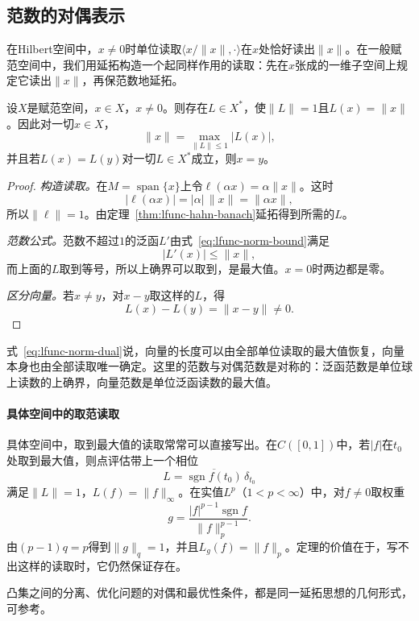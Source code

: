 \subsection{范数的对偶表示}
\label{sec:lfunc-norm-dual}

在Hilbert空间中，$x\neq0$时单位读取$\langle x/\lVert x\rVert,\cdot\rangle$在$x$处恰好读出$\lVert x\rVert$。在一般赋范空间中，我们用延拓构造一个起同样作用的读取：先在$x$张成的一维子空间上规定它读出$\lVert x\rVert$，再保范数地延拓。

\begin{theorem}[范数的对偶表示]
\label{thm:lfunc-norming}
设$X$是赋范空间，$x\in X$，$x\neq0$。则存在$L\in X^*$，使$\lVert L\rVert=1$且$L(x)=\lVert x\rVert$。因此对一切$x\in X$，
\begin{equation}
\lVert x\rVert=\max_{\lVert L\rVert\leq1}\lvert L(x)\rvert ,
\label{eq:lfunc-norm-dual}
\end{equation}
并且若$L(x)=L(y)$对一切$L\in X^*$成立，则$x=y$。
\end{theorem}

\begin{proof}
\emph{构造读取。}在$M=\operatorname{span}\{x\}$上令$\ell(\alpha x)=\alpha\lVert x\rVert$。这时
\[
\lvert\ell(\alpha x)\rvert=\lvert\alpha\rvert\,\lVert x\rVert=\lVert\alpha x\rVert ,
\]
所以$\lVert\ell\rVert=1$。由定理~\ref{thm:lfunc-hahn-banach}延拓得到所需的$L$。

\emph{范数公式。}范数不超过$1$的泛函$L'$由式~\eqref{eq:lfunc-norm-bound}满足
\[
\lvert L'(x)\rvert\leq\lVert x\rVert ,
\]
而上面的$L$取到等号，所以上确界可以取到，是最大值。$x=0$时两边都是零。

\emph{区分向量。}若$x\neq y$，对$x-y$取这样的$L$，得
\[
L(x)-L(y)=\lVert x-y\rVert\neq0 .
\]
\end{proof}

式~\eqref{eq:lfunc-norm-dual}说，向量的长度可以由全部单位读取的最大值恢复，向量本身也由全部读取唯一确定。这里的范数与对偶范数是对称的：泛函范数是单位球上读数的上确界，向量范数是单位泛函读数的最大值。

\paragraph{具体空间中的取范读取}
具体空间中，取到最大值的读取常常可以直接写出。在$C([0,1])$中，若$\lvert f\rvert$在$t_0$处取到最大值，则点评估带上一个相位
\[
L=\overline{\operatorname{sgn}f(t_0)}\,\delta_{t_0}
\]
满足$\lVert L\rVert=1$，$L(f)=\lVert f\rVert_\infty$。在实值$L^p$（$1<p<\infty$）中，对$f\neq0$取权重
\[
g=\frac{\lvert f\rvert^{p-1}\operatorname{sgn}f}{\lVert f\rVert_p^{p-1}} .
\]
由$(p-1)q=p$得到$\lVert g\rVert_q=1$，并且$L_g(f)=\lVert f\rVert_p$。定理的价值在于，写不出这样的读取时，它仍然保证存在。

凸集之间的分离、优化问题的对偶和最优性条件，都是同一延拓思想的几何形式，可参考。
